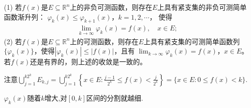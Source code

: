\documentclass[../../main.tex]{subfiles}%
\begin{document}
\begin{theorem}[简单函数逼近定理]\label{theorem:简单函数逼近定理}
(1) 若$f(x)$是$E\subseteq \mathbb{R}^n$上的非负可测函数，则存在$E$上具有紧支集的非负可测简单函数渐升列：
$\varphi_k(x) \leqslant \varphi_{k + 1}(x)$，$k = 1, 2, \cdots$，
使得
\begin{align}
\lim_{k \to \infty} \varphi_k(x) = f(x), \quad x \in E; \label{eq:3.5}
\end{align}
(2) 若$f(x)$是$E\subseteq \mathbb{R}^n$上的可测函数，则存在$E$上具有紧支集的可测简单函数列$\{\varphi_k(x)\}$，使得$|\varphi_k(x)| \leqslant |f(x)|$，且有
$\lim_{k \to \infty} \varphi_k(x) = f(x)$，$x \in E$。
若$f(x)$还是有界的，则上述的收敛是一致的。
\end{theorem}
\begin{remark}
注意$\bigcup_{j=1}^{k2^k}E_{k, j}=\bigcup_{j=1}^{k2^k}\left\{x \in E: \frac{j - 1}{2^k} \leqslant f(x) < \frac{j}{2^k} \right\}=\{x\in E:0\leqslant f(x)<k\}.$
\end{remark}
\begin{note}
$\varphi_k(x)$随着$k$增大,对$[0,k]$区间的分割就越细.
\end{note}
\end{document}
